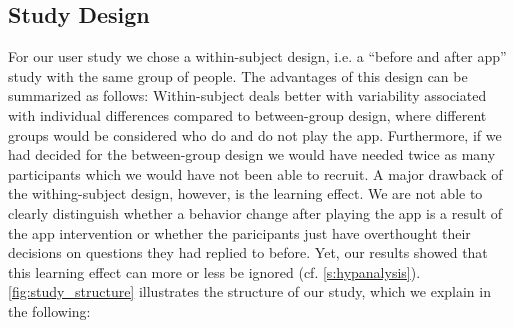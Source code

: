 \subsection{Study Design}
For our user study we chose a within-subject design, i.e. a ``before and after app'' study with the same group of people.
The advantages of this design can be summarized as follows:
Within-subject deals better with variability associated with individual differences compared to between-group design, where different groups would be considered who do and do not play the app.
Furthermore, if we had decided for the between-group design we would have needed twice as many participants which we would have not been able to recruit.
A major drawback of the withing-subject design, however, is the learning effect.
We are not able to clearly distinguish whether a behavior change after playing the app is a result of the app intervention or whether the paricipants just have overthought their decisions on questions they had replied to before.
Yet, our results showed that this learning effect can more or less be ignored (cf. \autoref{s:hypanalysis}).
\autoref{fig:study_structure} illustrates the structure of our study, which we explain in the following: 
